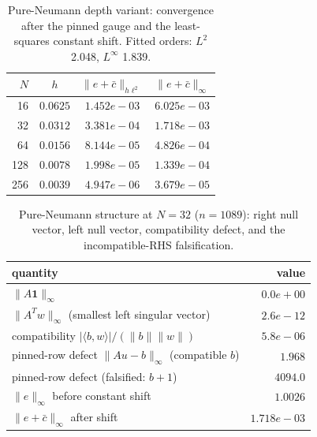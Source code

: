 \begin{table}[H]
\centering\small
\caption{Pure-Neumann depth variant: convergence after the pinned gauge and the least-squares constant shift.  Fitted orders: $L^2$ 2.048, $L^\infty$ 1.839.}
\label{tab:pure-neumann}
\begin{tabular}{rccc}
\toprule
$N$ & $h$ & $\lVert e+\bar c\rVert_{h\ell^2}$ & $\lVert e+\bar c\rVert_{\infty}$ \\
\midrule
16 & $0.0625$ & $1.452e-03$ & $6.025e-03$ \\
32 & $0.0312$ & $3.381e-04$ & $1.718e-03$ \\
64 & $0.0156$ & $8.144e-05$ & $4.826e-04$ \\
128 & $0.0078$ & $1.998e-05$ & $1.339e-04$ \\
256 & $0.0039$ & $4.947e-06$ & $3.679e-05$ \\
\bottomrule
\end{tabular}
\end{table}

\begin{table}[H]
\centering\small
\caption{Pure-Neumann structure at $N=32$ ($n=1089$): right null vector, left null vector, compatibility defect, and the incompatible-RHS falsification.}
\label{tab:pure-struct}
\begin{tabular}{lr}
\toprule
quantity & value \\
\midrule
$\lVert A\mathbf{1}\rVert_\infty$ & $0.0e+00$ \\
$\lVert A^T w\rVert_\infty$ (smallest left singular vector) & $2.6e-12$ \\
compatibility $|\langle b,w\rangle|/(\lVert b\rVert\lVert w\rVert)$ & $5.8e-06$ \\
pinned-row defect $\lVert Au-b\rVert_\infty$ (compatible $b$) & $1.968$ \\
pinned-row defect (falsified: $b+1$) & $4094.0$ \\
$\lVert e\rVert_\infty$ before constant shift & $1.0026$ \\
$\lVert e+\bar c\rVert_\infty$ after shift & $1.718e-03$ \\
\bottomrule
\end{tabular}
\end{table}